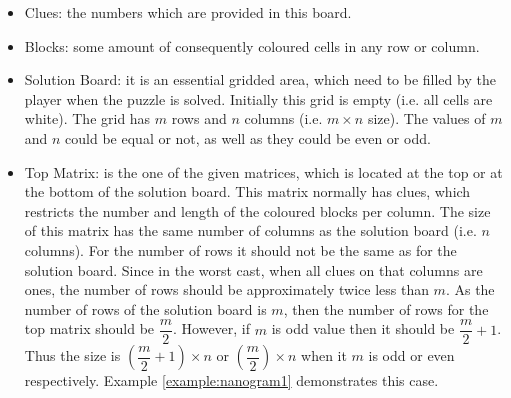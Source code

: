 \begin{itemize}

	\item Clues: the numbers which are provided in this board.

	\item Blocks: some amount of consequently coloured cells in any row or column.

	\item Solution Board: it is an essential gridded area, which need to be filled by the player when the puzzle is solved. Initially this grid is empty (i.e. all cells are white). The grid has $m$ rows and $n$ columns (i.e. $m\times n$ size). The values of $m$ and $n$ could be equal or not, as well as they could be even or odd.

	\item Top Matrix: is the one of the given matrices, which is located at the top or at the bottom of the solution board. This matrix normally has clues, which restricts the number and length of the coloured blocks per column. The size of this matrix has the same number of columns as the solution board (i.e. $n$ columns). 
	For the number of rows it should not be the same as for the solution board. Since in the worst cast, when all clues on that columns are ones, the number of rows should be approximately twice less than $m$. As the number of rows of the solution board is $m$, then the number of rows for the top matrix should be $\dfrac {m} {2}$. However, if $m$ is odd value then it should be $\dfrac {m} {2}+1$. Thus the size is $(\dfrac {m} {2}+1)\times n$ or $(\dfrac {m} {2})\times n$ when it $m$ is odd or even respectively. Example \ref{example:nanogram1} demonstrates this case.\\


\end{itemize}
